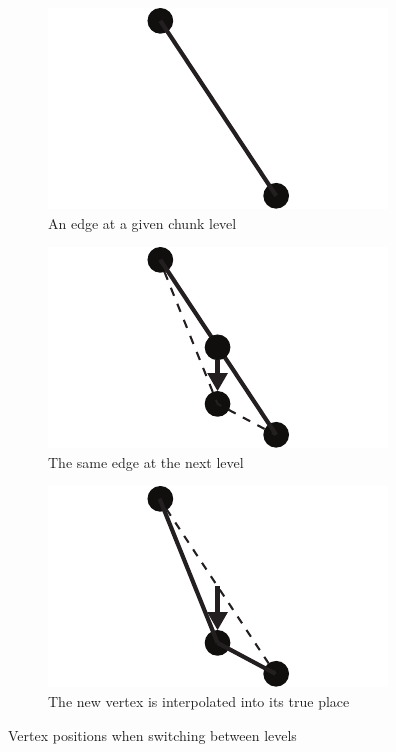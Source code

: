 \begin{figure}[htbp]
    \centering
    \begin{subfigure}[t]{0.3\textwidth}
        \includegraphics[width=\textwidth]{figures/chunkedlod/switching1.pdf}
        \caption{An edge at a given chunk level}
    \end{subfigure}
    \quad
    \begin{subfigure}[t]{0.3\textwidth}
        \includegraphics[width=\textwidth]{figures/chunkedlod/switching2.pdf}
        \caption{The same edge at the next level}
    \end{subfigure}
    \quad
    \begin{subfigure}[t]{0.3\textwidth}
        \includegraphics[width=\textwidth]{figures/chunkedlod/switching3.pdf}
        \caption{The new vertex is interpolated into its true place}
    \end{subfigure}
    \caption{Vertex positions when switching between levels}
    \label{fig:lodswitch}
\end{figure}

